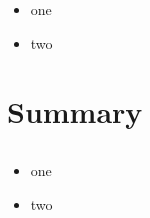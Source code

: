 \documentclass[xcolor=svgnames,aspectratio=169]{beamer}
\begin{document}
\begin{frame}{}
  \begin{itemize}\setlength{\itemsep}{3mm}
    \item one
    \item two
  \end{itemize}
\end{frame}

\section{Summary}
\subsection{} %

\begin{frame}{}
  \begin{itemize}\setlength{\itemsep}{3mm}
    \item one
    \item two
  \end{itemize}
\end{frame}
\end{document}
